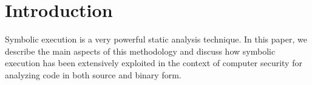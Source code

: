 
\section{Introduction}

Symbolic execution is a very powerful static analysis technique. In this paper, we describe the main aspects of this methodology and discuss how symbolic execution has been extensively exploited in the context of computer security for analyzing code in both source and binary form.